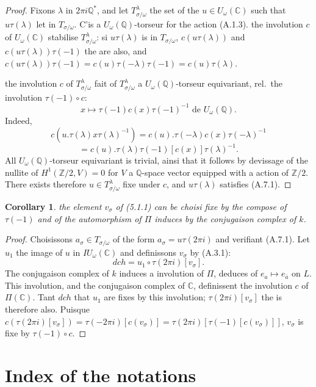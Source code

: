 \documentclass[11pt,a4paper]{article}
\theoremstyle{plain}
\newtheorem{corollary}[theorem]{Corollary}
\theoremstyle{definition}
\newcommand{\dch}{\mathit{dch}}
\newcommand{\Q}{\mathbb{Q}}
\newcommand{\Z}{\mathbb{Z}}
\newcommand{\C}{\mathbb{C}}
\begin{document}
\begin{proof}
Fixons $\lambda$ in $2\pi i \Q^*$, and let $T_{\sigma/\omega}^\lambda$ the set of the $u \in U_\omega(\C)$ such that $u \tau(\lambda)$ let in $T_{\sigma/\omega}$. C'is a $U_\omega(\Q)$-torseur for the action (A.1.3). the involution $c$ of $U_\omega(\C)$ stabilise $T_{\sigma/\omega}^\lambda$: si $u \tau(\lambda)$ is in $T_{\sigma/\omega}$, $c(u \tau(\lambda))$ and $c(u \tau(\lambda)) \tau(-1)$ the are also, and $c(u \tau(\lambda)) \tau(-1) = c(u) \tau(-\lambda) \tau(-1) = c(u) \tau(\lambda)$.

the involution $c$ of $T_{\sigma/\omega}^\lambda$ fait of $T_{\sigma/\omega}^\lambda$ a $U_\omega(\Q)$-torseur equivariant, rel.~the involution $\tau(-1) \circ c$:
\[
x \mapsto \tau(-1) c(x) \tau(-1)^{-1} \text{ de } U_\omega(\Q).
\]
Indeed,
\[
c(u.\tau(\lambda) x \tau(\lambda)^{-1}) = c(u).\tau(-\lambda) c(x) \tau(-\lambda)^{-1}
\]
\[
= c(u).\tau(\lambda) \tau(-1)[c(x)] \tau(\lambda)^{-1}.
\]
All $U_\omega(\Q)$-torseur equivariant is trivial, ainsi that it follows by devissage of the nullite of $H^1(\Z/2, V) = 0$ for $V$ a $\Q$-space vector equipped with a action of $\Z/2$. There exists therefore $u \in T_{\sigma/\omega}^\lambda$ fixe under $c$, and $u \tau(\lambda)$ satisfies (A.7.1).
\end{proof}

\begin{corollary}\label{cor:A.8}
the element $v_\sigma$ of (5.1.1) can be choisi fixe by the compose of $\tau(-1)$ and of the automorphism of $\Pi$ induces by the conjugaison complex of $k$.
\end{corollary}

\begin{proof}
Choisissons $a_\sigma \in T_{\sigma/\omega}$ of the form $a_\sigma = u \tau(2\pi i)$ and verifiant (A.7.1). Let $u_1$ the image of $u$ in $IU_\omega(\C)$ and definissons $v_\sigma$ by (A.3.1):
\[
\dch = u_1 \circ \tau(2\pi i)[v_\sigma].
\]
The conjugaison complex of $k$ induces a involution of $\Pi$, deduces of $e_a \mapsto e_{\bar{a}}$ on $L$. This involution, and the conjugaison complex of $\C$, definissent the involution $c$ of $\Pi(\C)$. Tant $\dch$ that $u_1$ are fixes by this involution; $\tau(2\pi i)[v_\sigma]$ the is therefore also. Puisque $c(\tau(2\pi i)[v_\sigma]) = \tau(-2\pi i)[c(v_\sigma)] = \tau(2\pi i)[\tau(-1)[c(v_\sigma)]]$, $v_\sigma$ is fixe by $\tau(-1) \circ c$.
\end{proof}


\section*{Index of the notations}
\end{document}

